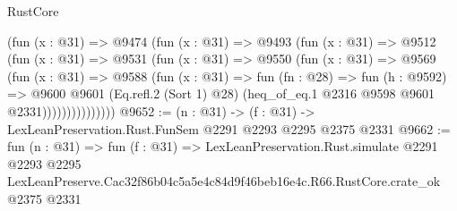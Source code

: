 \begin{lexlean}{RustCore}
\begin{coremodule}
                (fun (x : @31) =>
                @9474
                  (fun (x : @31) =>
                  @9493
                    (fun (x : @31) =>
                    @9512
                      (fun (x : @31) =>
                      @9531
                        (fun (x : @31) =>
                        @9550
                          (fun (x : @31) =>
                          @9569
                            (fun (x : @31) =>
                            @9588
                              (fun (x : @31) =>
                              fun (fn : @28) =>
                              fun (h : @9592) =>
                              @9600
                                @9601
                                (Eq.refl.{2} (Sort 1) @28)
                                (heq_of_eq.{1} @2316 @9598 @9601 @2331)))))))))))))))
@9652 := (n : @31) -> (f : @31) -> LexLeanPreservation.Rust.FunSem @2291 @2293 @2295 @2375 @2331
@9662 := fun (n : @31) =>
  fun (f : @31) =>
  LexLeanPreservation.Rust.simulate
    @2291
    @2293
    @2295
    LexLeanPreserve.Cac32f86b04c5a5e4c84d9f46beb16e4c.R66.RustCore.crate_ok
    @2375
    @2331
\end{coremodule}
\end{lexlean}
